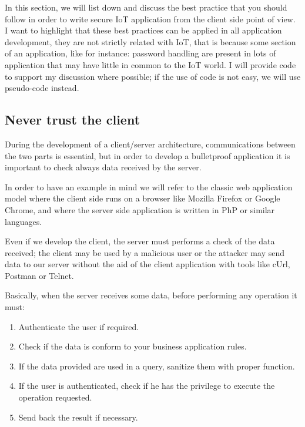 In this section, we will list down and discuss the best practice that you should follow in order to write secure IoT application from the client side point of view.\newline
I want to highlight that these best practices can be applied in all application development, they are not strictly related with IoT, that is because some section of an application, like for instance: password handling are present in lots of application that may have little in common to the IoT world.\newline
I will provide code to support my discussion where possible; if the use of code is not easy, we will use pseudo-code instead.\newline

\subsection{Never trust the client}
During the development of a client/server architecture, communications between the two parts is essential, but in order to develop a bulletproof application it is important to check always data received by the server.\newline

In order to have an example in mind we will refer to the classic web application model where the client side runs on a browser like Mozilla Firefox or Google Chrome, and where the server side application is written in PhP or similar languages.\newline

Even if we develop the client, the server must performs a check of the data received; the client may be used by a malicious user or the attacker may send data to our server without the aid of the client application with tools like cUrl, Postman or Telnet.\newline

Basically, when the server receives some data, before performing any operation it must:
\begin{enumerate}
	\item Authenticate the user if required.
	\item Check if the data is conform to your business application rules.
	\item If the data provided are used in a query, sanitize them with proper function.
	\item If the user is authenticated, check if he has the privilege to execute the operation requested.
	\item Send back the result if necessary.
\end{enumerate}

